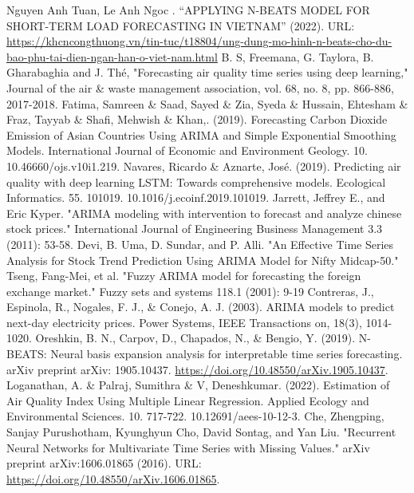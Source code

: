 \documentclass[conference]{IEEEtran}
\begin{document}
\begin{thebibliography}{00}
     Nguyen Anh Tuan, Le Anh Ngoc . “APPLYING N-BEATS MODEL FOR SHORT-TERM LOAD FORECASTING IN VIETNAM” (2022). URL: \url{https://khcncongthuong.vn/tin-tuc/t18804/ung-dung-mo-hinh-n-beats-cho-du-bao-phu-tai-dien-ngan-han-o-viet-nam.html}
     B. S, Freemana, G. Taylora, B. Gharabaghia and J. Thé, "Forecasting air quality time series using deep learning," Journal of the air \& waste management association, vol. 68, no. 8, pp. 866-886, 2017-2018.
     Fatima, Samreen \& Saad, Sayed \& Zia, Syeda \& Hussain, Ehtesham \& Fraz, Tayyab \& Shafi, Mehwish \& Khan,. (2019). Forecasting Carbon Dioxide Emission of Asian Countries Using ARIMA and Simple Exponential Smoothing Models. International Journal of Economic and Environment Geology. 10. 10.46660/ojs.v10i1.219.
     Navares, Ricardo \& Aznarte, José. (2019). Predicting air quality with deep learning LSTM: Towards comprehensive models. Ecological Informatics. 55. 101019. 10.1016/j.ecoinf.2019.101019.
     Jarrett, Jeffrey E., and Eric Kyper. "ARIMA modeling with intervention to forecast and analyze chinese stock prices." International Journal of Engineering Business Management 3.3 (2011): 53-58.
     Devi, B. Uma, D. Sundar, and P. Alli. "An Effective Time Series Analysis for Stock Trend Prediction Using ARIMA Model for Nifty Midcap-50."
     Tseng, Fang-Mei, et al. "Fuzzy ARIMA model for forecasting the foreign exchange market." Fuzzy sets and systems 118.1 (2001): 9-19
     Contreras, J., Espinola, R., Nogales, F. J., \& Conejo, A. J. (2003). ARIMA models to predict next-day electricity prices. Power Systems, IEEE Transactions on, 18(3), 1014-1020.
     Oreshkin, B. N., Carpov, D., Chapados, N., \& Bengio, Y. (2019). N-BEATS: Neural basis expansion analysis for interpretable time series forecasting. arXiv preprint arXiv: 1905.10437. \url{https://doi.org/10.48550/arXiv.1905.10437}.
     Loganathan, A. \& Palraj, Sumithra \& V, Deneshkumar. (2022). Estimation of Air Quality Index Using Multiple Linear Regression. Applied Ecology and Environmental Sciences. 10. 717-722. 10.12691/aees-10-12-3.
    Che, Zhengping, Sanjay Purushotham, Kyunghyun Cho, David Sontag, and Yan Liu.
    "Recurrent Neural Networks for Multivariate Time Series with Missing Values."
    arXiv preprint arXiv:1606.01865 (2016).
    URL: \url{https://doi.org/10.48550/arXiv.1606.01865}.
\end{thebibliography}
\end{document}
